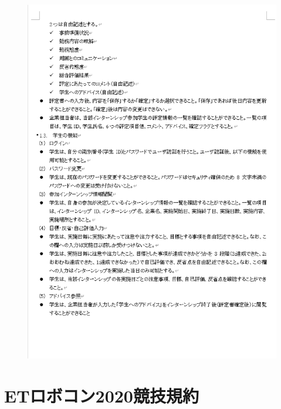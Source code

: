 \documentclass[uplatex, report, a4j, 10pt]{jsbook}
\begin{document}
\begin{figure}[tp]
    \begin{center}
    \includegraphics[width=\hsize]{specification/internship_3.eps}
    \end{center}
\end{figure}

\chapter{ETロボコン2020競技規約}    \label{ET_Specification}
\end{document}
